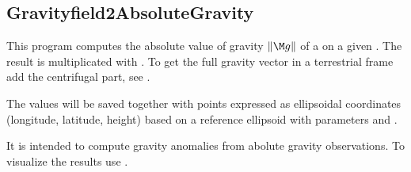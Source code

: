 \subsection{Gravityfield2AbsoluteGravity}\label{Gravityfield2AbsoluteGravity}
This program computes the absolute value of gravity $\left\lVert{\M g}\right\rVert$
of a  on a given .
The result is multiplicated with .
To get the full gravity vector in a terrestrial frame add
the centrifugal part, see .

The values will be saved together with points expressed as ellipsoidal coordinates (longitude, latitude, height)
based on a reference ellipsoid with parameters  and .

It is intended to compute gravity anomalies from abolute gravity observations.
To visualize the results use .


